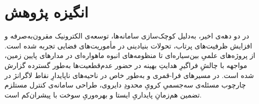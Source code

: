 %
%
%
\section{انگیزه پژوهش}\label{sec:motivation}

در دو دهه‌ی اخیر، به‌دلیل کوچک‌سازی سامانه‌ها، توسعه‌ی الکترونیک مقرون‌به‌صرفه و افزایش ظرفیت‌های پرتاب، تحولات بنیادینی در مأموریت‌های فضایی تجربه شده است. از پروژه‌های علمیِ بین‌سیاره‌ای تا منظومه‌های انبوه ماهواره‌ای در مدارهای پایین زمین، مواجهه با چالشِ فراگیرِ هدایتِ بهینه در حضور عدم‌قطعیت‌ها به‌طور گسترده گزارش شده است. در مسیرهای فرا-قمری
و به‌طور خاص در ناحیه‌های ناپایدارِ نقاط لاگرانژ در چارچوب مسئله‌ی سه‌جسمیِ کرویِ محدودِ دایروی، طراحی سامانه‌ی کنترل مستلزم تضمین هم‌زمانِ پایداریِ ایستا و بهره‌وریِ سوخت با پیشران‌کم است.

